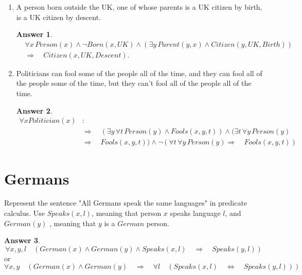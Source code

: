 \documentclass[a4paper]{article}
\renewcommand{\(}{\left(}
\renewcommand{\)}{\right)}
\theoremstyle{plain}
\theoremstyle{plain}
\theoremstyle{definition}
\newtheorem*{answer}{Answer}
\begin{document}
\begin{enumerate}[label*=\alph*.,ref=\alph*]
\item A person born outside the UK, one of whose parents is a UK citizen by birth, is a UK citizen by descent.
\begin{shaded}
\begin{answer}
\begin{align*}
&\forall x \, Person(x) \wedge \neg Born(x,UK) \wedge (\exists y \, Parent(y, x) \wedge Citizen(y,UK,Birth)) \\
& \Rightarrow \quad Citizen(x,UK,Descent).
\end{align*}
\end{answer}
\end{shaded}

\item Politicians can fool some of the people all of the time, and they can fool all of the people some of the time, but they can't fool all of the people all of the time.
\begin{shaded}
\begin{answer}
\begin{align*}
  \forall x Politician(x) & : \\
   &\Rightarrow \quad (\exists y \, \forall t \, Person(y) \wedge Fools(x, y, t)) \wedge (\exists t \, \forall y \, Person(y) \\
  & \Rightarrow \quad Fools(x, y, t)) \wedge \neg (\forall t \, \forall y \, Person(y) \Rightarrow \quad Fools(x, y, t))
\end{align*}
\end{answer}
\end{shaded}


\end{enumerate}
\section{Germans}
 Represent the sentence "All Germans speak the same
languages" in predicate calculus. Use $Speaks(x,l)$, meaning that person $x$ speaks
language $l$, and $German(y)$ , meaning that $y$ is a $German$ person.
\begin{shaded}
\begin{answer}
\begin{equation*}
  \forall x , y , l \quad \left(German(x) \wedge German(y) \wedge Speaks (x,l) \quad \Rightarrow \quad Speaks(y,l) \right)
\end{equation*}
or
\begin{equation*}
  \forall x , y \quad \left(German(x) \wedge German(y)   \quad \Rightarrow \quad \forall l \quad (Speaks (x,l) \quad \Leftrightarrow \quad Speaks(y,l)) \right)
\end{equation*}

\end{answer}
\end{shaded}
\end{document}
